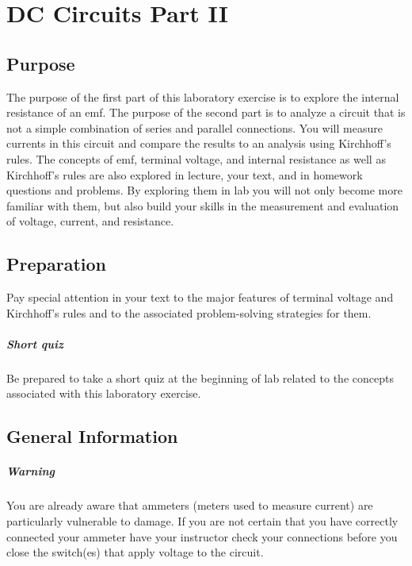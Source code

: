 \chapter {DC Circuits Part II}

\section {Purpose}  
The purpose of the first part of this laboratory exercise is to explore the internal resistance of an emf.  The purpose of the second part is to analyze a circuit that is not a simple combination of series and parallel connections.  You will measure currents in this circuit and compare the results to an analysis using Kirchhoff's rules.  The concepts of emf, terminal voltage, and internal resistance as well as Kirchhoff's rules are also explored in lecture, your text, and in homework questions and problems.  By exploring them in lab you will not only become more familiar with them, but also build your skills in the measurement and evaluation of voltage, current, and resistance.

\section {Preparation} Pay special attention in your text to the major features of terminal voltage and Kirchhoff's rules and to the associated problem-solving strategies for them.

\paragraph {Short quiz}  Be prepared to take a short quiz at the beginning of lab related to the concepts associated with this laboratory exercise.

\section {General Information}
\paragraph {Warning}  You are already aware that ammeters (meters used to measure current) are particularly vulnerable to damage.  If you are not certain that you have correctly connected your ammeter have your instructor check your connections before you close the switch(es) that apply voltage to the circuit.

